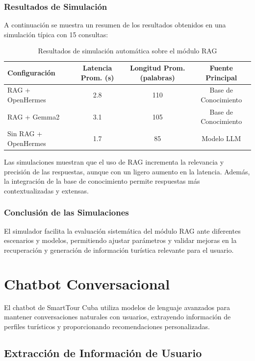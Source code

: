 \documentclass[runningheads]{llncs}
\begin{document}
\subsubsection{Resultados de Simulación}

A continuación se muestra un resumen de los resultados obtenidos en una simulación típica con 15 consultas:

\begin{table}[H]
\centering
\begin{tabular}{lccc}
\toprule
\textbf{Configuración} & \textbf{Latencia Prom. (s)} & \textbf{Longitud Prom. (palabras)} & \textbf{Fuente Principal} \\
\midrule
RAG + OpenHermes & 2.8 & 110 & Base de Conocimiento \\
RAG + Gemma2 & 3.1 & 105 & Base de Conocimiento \\
Sin RAG + OpenHermes & 1.7 & 85 & Modelo LLM \\
\bottomrule
\end{tabular}
\caption{Resultados de simulación automática sobre el módulo RAG}
\end{table}

Las simulaciones muestran que el uso de RAG incrementa la relevancia y precisión de las respuestas, aunque con un ligero aumento en la latencia. Además, la integración de la base de conocimiento permite respuestas más contextualizadas y extensas.

\subsubsection{Conclusión de las Simulaciones}

El simulador facilita la evaluación sistemática del módulo RAG ante diferentes escenarios y modelos, permitiendo ajustar parámetros y validar mejoras en la recuperación y generación de información turística relevante para el usuario.

\section{Chatbot Conversacional}


El chatbot de SmartTour Cuba utiliza modelos de lenguaje avanzados para mantener conversaciones naturales con usuarios, extrayendo información de perfiles turísticos y proporcionando recomendaciones personalizadas.


\subsection{Extracción de Información de Usuario}
\end{document}
